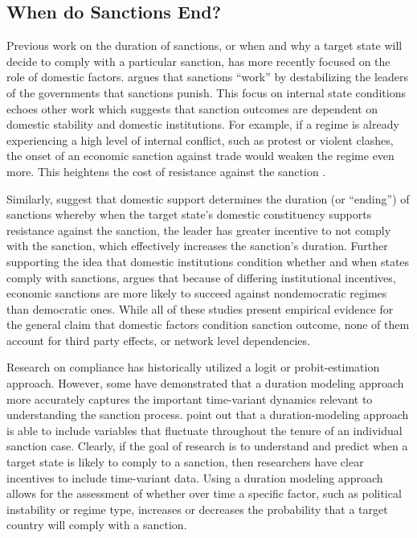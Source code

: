 \subsection*{When do Sanctions End?}
\label{lit}

Previous work on the duration of sanctions, or when and why a target state will decide to comply with a particular sanction, has more recently focused on the role of domestic factors. \cite{marinov2005} argues that sanctions ``work'' by destabilizing the leaders of the governments that sanctions punish. This focus on internal state conditions echoes other work which suggests that sanction outcomes are dependent on domestic stability and domestic institutions. For example, if a regime is already experiencing a high level of internal conflict, such as protest or violent clashes, the onset of an economic sanction against trade would weaken the regime even more. This heightens the cost of resistance against the sanction \citep{dashti1997}. 

Similarly, \citep{dorussen2001} suggest that domestic support determines the duration (or ``ending'') of sanctions whereby when the target state's domestic constituency supports resistance against the sanction, the leader has greater incentive to not comply with the sanction, which effectively increases the sanction's duration. Further supporting the idea that domestic institutions condition whether and when states comply with sanctions, \cite{lektzian2007} argues that because of differing institutional incentives, economic sanctions are more likely to succeed against nondemocratic regimes than democratic ones. While all of these studies present empirical evidence for the general claim that domestic factors condition sanction outcome, none of them account for third party effects, or network level dependencies. 

Research on compliance has historically utilized a logit or probit-estimation approach. However, some have demonstrated that a duration modeling approach more accurately captures the important time-variant dynamics relevant to understanding the sanction process. \cite{bolks2000} point out that a duration-modeling approach is able to include variables that fluctuate throughout the tenure of an individual sanction case. Clearly, if the goal of research is to understand and predict when a target state is likely to comply to a sanction, then researchers have clear incentives to include time-variant data. Using a duration modeling approach allows for the assessment of whether over time a specific factor, such as political instability or regime type, increases or decreases the probability that a target country will comply with a sanction.

